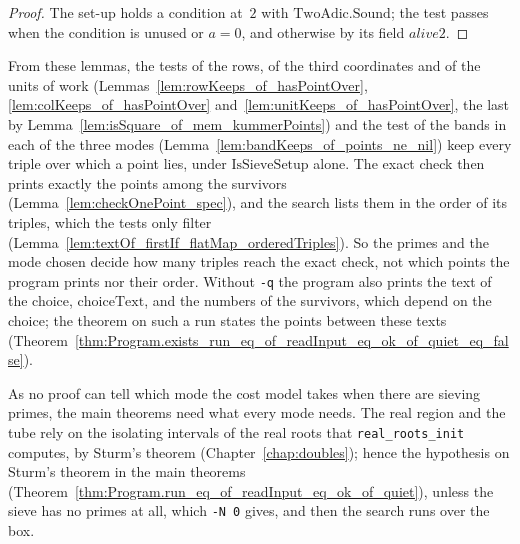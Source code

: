 \begin{proof}
  \leanok
  The set-up holds a condition at~$2$ with $\mathrm{TwoAdic.Sound}$; the test passes when the
  condition is unused or $a = 0$, and otherwise by its field $\mathit{alive2}$.
\end{proof}

From these lemmas, the tests of the rows, of the third coordinates and of the units of work
(Lemmas~\ref{lem:rowKeeps_of_hasPointOver}, \ref{lem:colKeeps_of_hasPointOver}
and~\ref{lem:unitKeeps_of_hasPointOver}, the last by Lemma~\ref{lem:isSquare_of_mem_kummerPoints})
and the test of the bands in each of the three modes (Lemma~\ref{lem:bandKeeps_of_points_ne_nil})
keep every triple over which a point lies, under $\mathrm{IsSieveSetup}$ alone. The exact check then
prints exactly the points among the survivors (Lemma~\ref{lem:checkOnePoint_spec}), and the search
lists them in the order of its triples, which the tests only filter
(Lemma~\ref{lem:textOf_firstIf_flatMap_orderedTriples}). So the primes and the mode chosen decide
how many triples reach the exact check, not which points the program prints nor their order. Without
\texttt{-q} the program also prints the text of the choice, $\mathrm{choiceText}$, and the numbers
of the survivors, which depend on the choice; the theorem on such a run states the points between
these texts (Theorem~\ref{thm:Program.exists_run_eq_of_readInput_eq_ok_of_quiet_eq_false}).

As no proof can tell which mode the cost model takes when there are sieving primes, the main
theorems need what every mode needs. The real region and the tube rely on the isolating intervals of
the real roots that \texttt{real\_roots\_init} computes, by Sturm's theorem
(Chapter~\ref{chap:doubles}); hence the hypothesis on Sturm's theorem in the main theorems
(Theorem~\ref{thm:Program.run_eq_of_readInput_eq_ok_of_quiet}), unless the sieve has no primes at all, which \texttt{-N 0} gives, and then the search runs over
the box.
